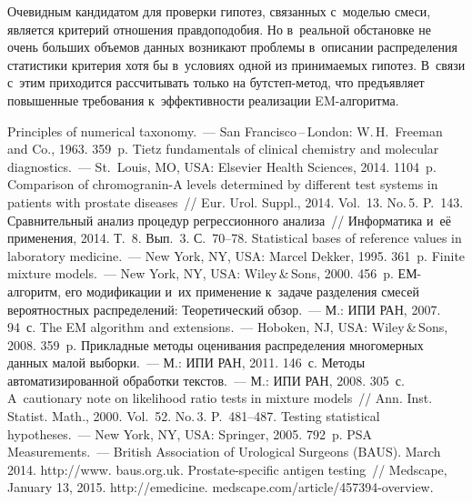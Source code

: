 \begin{multicols}{2}
     Очевидным кандидатом для проверки гипотез, связанных с~моделью
смеси, является критерий отношения правдоподобия. Но в~реальной обстановке
не очень больших объемов данных возникают проблемы в~описании
распределения статистики критерия хотя бы в~условиях одной из принимаемых
гипотез. В~связи с~этим приходится рассчитывать только на бут\-степ-ме\-тод, что
предъявляет повышенные требования к~эффективности реализации
     EM-ал\-го\-ритма.

{\small\frenchspacing
 {%
 \begin{thebibliography}{99}
 Principles of numerical taxonomy.~--- San
Francisco\,--\,London: W.\,H.~Freeman and Co., 1963. 359~p.
 Tietz fundamentals of clinical chemistry and
molecular diagnostics.~--- St.\ Louis, MO, USA: Elsevier Health Sciences, 2014. 1104~p.
Comparison of chromogranin-A levels determined by different test systems in
patients with prostate diseases~// Eur. Urol. Suppl., 2014. Vol.~13.
No.\,5. P.~143.
 Сравнительный анализ процедур регрессионного
анализа~// Информатика и~её применения, 2014. Т.~8. Вып.~3. С.~70--78.
 Statistical bases of reference values in laboratory
medicine.~--- New York, NY, USA: Marcel Dekker, 1995. 361~p.
 Finite mixture models.~--- New York,
NY, USA: Wiley\,\&\,Sons,
2000. 456~p.
 ЕМ-ал\-го\-ритм, его модификации и~их применение к~задаче разделения смесей вероятностных распределений: Теоретический
обзор.~--- М.: ИПИ РАН, 2007. 94~с.
 The EM algorithm and extensions.~--- Hoboken,
NJ, USA: Wiley\,\&\,Sons, 2008. 359~p.
 Прикладные методы оценивания распределения
многомерных данных малой выборки.~--- М.: ИПИ РАН, 2011. 146~с.
 Методы автоматизированной обработки
текстов.~--- М.: ИПИ РАН, 2008. 305~с.
 A~cautionary note on likelihood ratio tests in
mixture models~// Ann. Inst. Statist. Math., 2000. Vol.~52. No.\,3. P.~481--487.
 Testing statistical hypotheses.~---
New York, NY, USA:
Springer, 2005. 792~p.
PSA Measurements.~--- British Association of Urological Surgeons (BAUS). March
2014. {\sf http://www. baus.org.uk}.
 Prostate-specific antigen testing~// Medscape, January 13, 2015.
{\sf http://emedicine. medscape.com/article/457394-overview}.
 \end{thebibliography}

 }
 }

\end{multicols}

